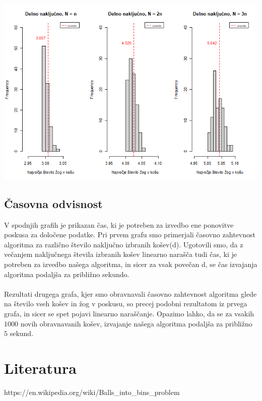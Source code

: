 \documentclass[a4paper, 11pt]{article}
\begin{document}
\includegraphics[scale=0.60]{delno_nakljucno2.png}

\subsection{Časovna odvisnost}

V spodnjih grafih je prikazan čas, ki je potreben za izvedbo ene ponovitve poskusa za določene podatke. 
Pri prvem grafu smo primerjali časovno zahtevnost algoritma za različno število naključno izbranih košev(d). 
Ugotovili smo, da z večanjem naključnega števila izbranih košev linearno narašča tudi čas, ki je potreben za izvedbo našega algoritma, in sicer za vsak povečan d, se čas izvajanja algoritma podaljša za približno sekundo.
\\
\\
Rezultati drugega grafa, kjer smo obravnavali časovno zahtevnost algoritma glede na število vseh košev in žog v poskusu, so precej podobni rezultatom iz prvega grafa, in sicer se spet pojavi linearno naraščanje. 
Opazimo lahko, da se za vsakih $1000$ novih obravnavanih košev, izvajanje našega algoritma podaljša za približno $5$ sekund. 

\pagebreak
\section*{Literatura}

https://en.wikipedia.org/wiki/Balls\_into\_bins\_problem
\end{document}
